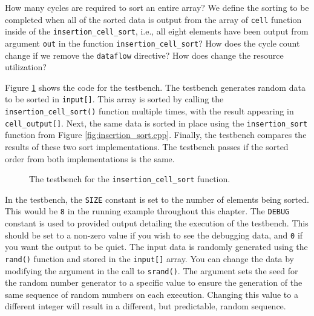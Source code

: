 \begin{exercise}
How many cycles are required to sort an entire array? We define the sorting to be completed when all of the sorted data is output from the array of \lstinline{cell} function inside of the \lstinline{insertion_cell_sort}, i.e., all eight elements have been output from argument \lstinline{out} in the function \lstinline{insertion_cell_sort}? How does the cycle count change if we remove the \lstinline{dataflow} directive? How does change the resource utilization?
\end{exercise}

Figure \ref{fig:insertion_cell_sort_test.cpp} shows the code for the testbench. The testbench generates random data to be sorted in \lstinline{input[]}. This array is sorted by calling the \lstinline{insertion_cell_sort()} function multiple times, with the result appearing in \lstinline{cell_output[]}. Next, the same data is sorted in place using the \lstinline{insertion_sort} function from Figure \ref{fig:insertion_sort.cpp}. Finally, the testbench compares the results of these two sort implementations. The testbench passes if the sorted order from both implementations is the same.

\begin{figure}
{\tiny }
%
\caption{  The testbench for the \lstinline{insertion_cell_sort} function. }
\label{fig:insertion_cell_sort_test.cpp}
\end{figure}

In the testbench, the \lstinline{SIZE} constant is set to the number of elements being sorted. This would be \lstinline{8} in the running example throughout this chapter. The \lstinline{DEBUG} constant is used to provided output detailing the execution of the testbench. This should be set to a non-zero value if you wish to see the debugging data, and \lstinline{0} if you want the output to be quiet. The input data is randomly generated using the \lstinline{rand()} function and stored in the \lstinline{input[]} array. You can change the data by modifying the argument in the call to \lstinline{srand()}.  The argument sets the seed for the random number generator to a specific value to ensure the generation of the same sequence of random numbers on each execution.  Changing this value to a different integer will result in a different, but predictable, random sequence.

